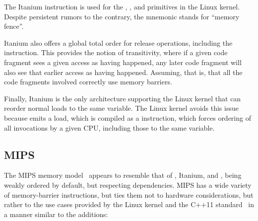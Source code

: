 The Itanium  instruction is used for the ,
, and  primitives in the Linux kernel.
Despite persistent rumors to the contrary, the  mnemonic stands
for ``memory fence''.

Itanium also offers a global total order for release operations,
including the  instruction.
This provides the notion of transitivity, where if a given code fragment
sees a given access as having happened, any later code fragment will
also see that earlier access as having happened.
Assuming, that is, that all the code fragments involved correctly use
memory barriers.

Finally, Itanium is the only architecture supporting the Linux kernel
that can reorder normal loads to the same variable.
The Linux kernel avoids this issue because  emits
a  load, which is compiled as a  instruction,
which forces ordering of all  invocations by a given
CPU, including those to the same variable.

\subsection{MIPS}

The MIPS memory model~\cite[page~479]{MIPSvII-A-2016}
appears to resemble that of \ARM, Itanium, and \Power{},
being weakly ordered by default, but respecting dependencies.
MIPS has a wide variety of memory-barrier instructions, but ties them
not to hardware considerations, but rather to the use cases provided
by the Linux kernel and the C++11 standard~\cite{RichardSmith2019N4800}
in a manner similar to the  additions:

